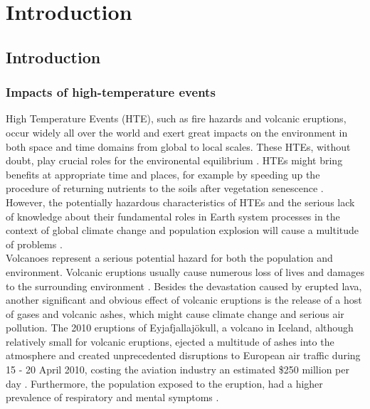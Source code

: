 \chapter{Introduction}

\label{Chapter1}

\newcommand{\keyword}[1]{\textbf{#1}}
\newcommand{\tabhead}[1]{\textbf{#1}}
\newcommand{\code}[1]{\texttt{#1}}
\newcommand{\file}[1]{\texttt{\bfseries#1}}
\newcommand{\option}[1]{\texttt{\itshape#1}}


\section{Introduction}


\subsection{Impacts of high-temperature events}

High Temperature Events (HTE), such as fire hazards and volcanic eruptions, occur widely all over the world and exert great impacts on the environment in both space and time domains from global to local scales. These HTEs, without doubt, play crucial roles for the environental equilibrium \parencite{Reference1}. HTEs might bring benefits at appropriate time and places, for example by speeding up the procedure of returning nutrients to the soils after vegetation senescence \parencite{Reference2}. However, the potentially hazardous characteristics of HTEs and the serious lack of knowledge about their fundamental roles in Earth system processes in the context of global climate change and population explosion will cause a multitude of problems \parencite{Reference3}.\\

\noindent Volcanoes represent a serious potential hazard for both the population and environment. Volcanic eruptions usually cause numerous loss of lives and damages to the surrounding environment \parencite{Reference12}. Besides the devastation caused by erupted lava, another significant and obvious effect of volcanic eruptions is the release of a host of gases and volcanic ashes, which might cause climate change and serious air pollution. The 2010 eruptions of Eyjafjallajökull, a volcano in Iceland, although relatively small for volcanic eruptions, ejected a multitude of ashes into the atmosphere and created unprecedented disruptions to European air traffic during 15 - 20 April 2010, costing the aviation industry an estimated \$250 million per day \parencite{Reference4}. Furthermore, the population exposed to the eruption, had a higher prevalence of respiratory and mental symptoms \parencite{Reference5}.\\


